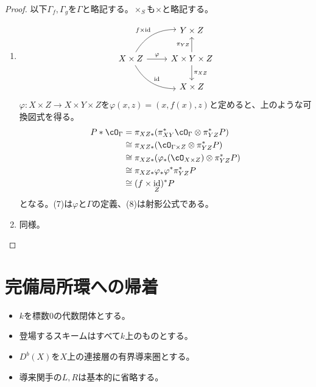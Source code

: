 \documentclass[uplatex, a4paper, dvipdfmx]{jsarticle}
\theoremstyle{definition}
\DeclareMathOperator{\id}{\mathrm{id}}
\begin{document}
\begin{proof}
    以下$\Gamma_f, \Gamma_g$を$\Gamma$と略記する。$\times_S$も$\times$と略記する。
    \begin{enumerate}
        \item \[
                  \begin{tikzcd}
                      & Y \times Z\\
                      X \times Z \ar[r, "\varphi"] \ar[rd, bend right, "\id"] \ar[ru, "f \times \id", bend left]& X \times Y \times Z \ar[d, "\pi_{XZ}"] \ar[u, "\pi_{YZ}"]\\
                      &X \times Z
                  \end{tikzcd}
              \]
              $\varphi \colon X \times Z \to X \times Y \times Z$を$\varphi(x, z) = (x, f(x), z)$と定めると、上のような可換図式を得る。
              \begin{align}
                  P * \cO_\Gamma & = \pi_{XZ*}(\pi_{XY}^*\cO_{\Gamma} \otimes \pi_{YZ}^*P)        \\
                                 & \cong \pi_{XZ*}(\cO_{\Gamma \times Z}\otimes\pi_{YZ}^*P)       \\
                                 & \cong \pi_{XZ*}(\varphi_*(\cO_{X \times Z})\otimes\pi_{YZ}^*P) \\
                                 & \cong \pi_{XZ*}\varphi_*\varphi^*\pi_{YZ}^*P                   \\
                                 & \cong (f \times \id_Z)^*P
              \end{align}
              となる。(7)は$\varphi$と$\Gamma$の定義、(8)は射影公式である。
        \item 同様。
    \end{enumerate}
\end{proof}

\section{完備局所環への帰着}
\begin{itemize}
    \item $k$を標数$0$の代数閉体とする。
    \item 登場するスキームはすべて$k$上のものとする。
    \item $D^b(X)$を$X$上の連接層の有界導来圏とする。
    \item 導来関手の$L, R$は基本的に省略する。
\end{itemize}
\end{document}

